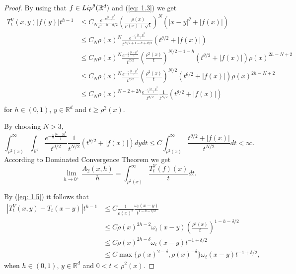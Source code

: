 \documentclass[10pt,a4paper]{amsart}
\newcommand{\Lip}{\textup{Lip}}
\newcommand{\RR}{\mathbb{R}}
\begin{document}
\begin{proof}
By using that $f\in \Lip^\theta(\mathbb{R}^d)$ and (\ref{eq: 1.3}) we get
\begin{align*}
T_t^V(x,y)|f(y)|t^{h-1}&\le {C_N}\frac{e^{-c\frac{|x-y|^2}{t}}}{t^{1-h+d/2}} \left(\frac{\rho(x)}{\rho(x)+\sqrt{t}}\right)^{{N}}(|x-y|^\theta+|f(x)|)\\
&\le {C_N}\rho(x)^{{N}}\frac{e^{-\frac c2\frac{|x-y|^2}{t}}}{t^{{N/2+1}-h+d/2}}(t^{\theta/2}+|f(x)|)\\
&\le {C_N}\rho(x)^{{N}}\frac{e^{-\frac c2\frac{|x-y|^2}{t}}}{t^{d/2}}\left(\frac{\rho^2(x)}{t}\right)^{{N/2+1}-h}(t^{\theta/2}+|f(x)|)\rho(x)^{2h-{N+2}}\\
&\le {C_N}\rho(x)^{{N}}\frac{e^{-\frac c2\frac{|x-y|^2}{t}}}{t^{d/2}}\left(\frac{\rho^2(x)}{t}\right)^{{N/2}}(t^{\theta/2}+|f(x)|)\rho(x)^{2h-{N+2}}\\
&\le {C_N}\rho(x)^{{N-2}+2h}\frac{e^{-\frac c2\frac{|x-y|^2}{t}}}{t^{d/2}}\frac{1}{t^{{N/2}}}(t^{\theta/2}+|f(x)|)\\
\end{align*}
for $h\in (0,1)$, $y\in \mathbb{R}^d$ and $t\ge \rho^2(x)$.

{By choosing $N>3$,}
\[
\int_{\rho^2(x)}^\infty \int_{\mathbb{R}^d}\frac{e^{-\frac c2\frac{|x-y|^2}{t}}}{t^{d/2}}\frac{1}{t^{{N/2}}}(t^{\theta/2}+|f(x)|)dydt\le C\int_{\rho^2(x)}^\infty\frac{t^{\theta/2}+|f(x)|}{t^{{N/2}}}dt<\infty.
\]
According to Dominated Convergence Theorem we get
\[
\lim_{h\to 0^+}\frac{A_2(x,h)}{h}=\int_{\rho^2(x)}^\infty\frac{T_t^V(f)(x)}{t}dt.
\]


By (\ref{eq: 1.5}) it follows that
\begin{align*}
 |T_t^V(x,y)-T_t(x-y)|t^{h-1}&\le C\frac{1}{\rho(x)^\delta}\frac{\omega_t(x-y)}{t^{1-h-\delta/2}}\\
& \le C\rho(x)^{2h-2} \omega_t(x-y) \left(\frac{\rho^2(x)}{t}\right)^{1-h-\delta/2}\\
&\le C\rho(x)^{2h-\delta}\omega_t(x-y) t^{-1+\delta/2}\\
&\le C\max\{\rho(x)^{2-\delta},\rho(x)^{-\delta}\}\omega_t(x-y)t^{-1+\delta/2},
\end{align*}
when $h\in (0,1)$, $y\in \mathbb{R}^d$ and $0<t<\rho^2(x)$.


\end{proof}
\end{document}
